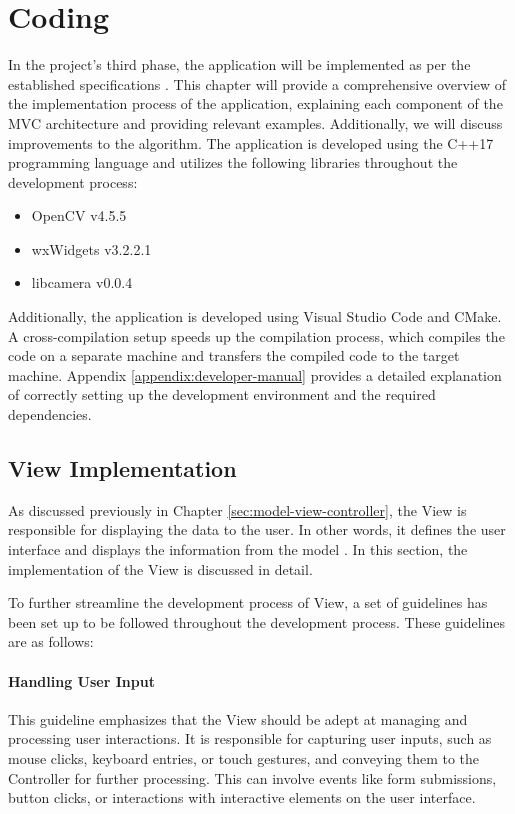\chapter{Coding}
\label{chapter:coding}

In the project's third phase, the application will be implemented as per the established specifications \cite{Hausen}. This chapter will provide a comprehensive overview of the implementation process of the application, explaining each component of the MVC architecture and providing relevant examples. Additionally, we will discuss improvements to the algorithm. The application is developed using the C++17 programming language and utilizes the following libraries throughout the development process:

\begin{itemize}
    \item OpenCV v4.5.5
    \item wxWidgets v3.2.2.1
    \item libcamera v0.0.4
\end{itemize}

Additionally, the application is developed using Visual Studio Code and CMake. A cross-compilation setup speeds up the compilation process, which compiles the code on a separate machine and transfers the compiled code to the target machine. Appendix \ref{appendix:developer-manual} provides a detailed explanation of correctly setting up the development environment and the required dependencies.

\section{View Implementation}
As discussed previously in Chapter \ref{sec:model-view-controller}, the View is responsible for displaying the data to the user. In other words,  it defines the user interface and displays the information from the model \cite{Krastev20}. In this section, the implementation of the View is discussed in detail.

To further streamline the development process of View,  a set of guidelines has been set up to be followed throughout the development process. These guidelines are as follows:

\subsubsection{Handling User Input}
This guideline emphasizes that the View should be adept at managing and processing user interactions. It is responsible for capturing user inputs, such as mouse clicks, keyboard entries, or touch gestures, and conveying them to the Controller for further processing. This can involve events like form submissions, button clicks, or interactions with interactive elements on the user interface.

